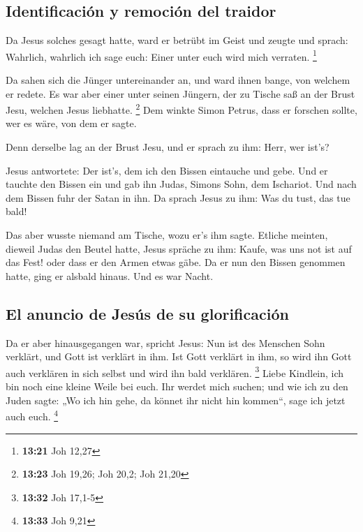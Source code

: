 \hypertarget{identificaciuxf3n-y-remociuxf3n-del-traidor}{%
\subsection{Identificación y remoción del
traidor}\label{identificaciuxf3n-y-remociuxf3n-del-traidor}}

 Da Jesus solches gesagt hatte, ward er betrübt im Geist
und zeugte und sprach: Wahrlich, wahrlich ich sage euch: Einer unter
euch wird mich verraten. \footnote{\textbf{13:21} Joh 12,27}

 Da sahen sich die Jünger untereinander an, und ward
ihnen bange, von welchem er redete.  Es war aber einer
unter seinen Jüngern, der zu Tische saß an der Brust Jesu, welchen Jesus
liebhatte. \footnote{\textbf{13:23} Joh 19,26; Joh 20,2; Joh 21,20}
 Dem winkte Simon Petrus, dass er forschen sollte, wer es
wäre, von dem er sagte.

 Denn derselbe lag an der Brust Jesu, und er sprach zu
ihm: Herr, wer ist's?

 Jesus antwortete: Der ist's, dem ich den Bissen
eintauche und gebe. Und er tauchte den Bissen ein und gab ihn Judas,
Simons Sohn, dem Ischariot.  Und nach dem Bissen fuhr der
Satan in ihn. Da sprach Jesus zu ihm: Was du tust, das tue bald!

 Das aber wusste niemand am Tische, wozu er's ihm sagte.
 Etliche meinten, dieweil Judas den Beutel hatte, Jesus
spräche zu ihm: Kaufe, was uns not ist auf das Fest! oder dass er den
Armen etwas gäbe.  Da er nun den Bissen genommen hatte,
ging er alsbald hinaus. Und es war Nacht.

\hypertarget{el-anuncio-de-jesuxfas-de-su-glorificaciuxf3n}{%
\subsection{El anuncio de Jesús de su
glorificación}\label{el-anuncio-de-jesuxfas-de-su-glorificaciuxf3n}}

 Da er aber hinausgegangen war, spricht Jesus: Nun ist
des Menschen Sohn verklärt, und Gott ist verklärt in ihm.
 Ist Gott verklärt in ihm, so wird ihn Gott auch
verklären in sich selbst und wird ihn bald verklären. \footnote{\textbf{13:32}
  Joh 17,1-5}  Liebe Kindlein, ich bin noch eine kleine
Weile bei euch. Ihr werdet mich suchen; und wie ich zu den Juden sagte:
„Wo ich hin gehe, da könnet ihr nicht hin kommen``, sage ich jetzt auch
euch. \footnote{\textbf{13:33} Joh 9,21}

